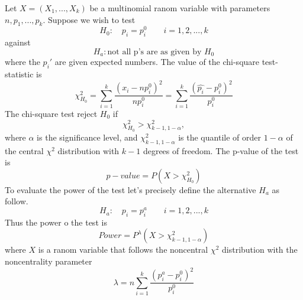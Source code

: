 \documentclass{article}
\begin{document}
Let $X=(X_1, ..., X_k)$ be a multinomial ranom variable with parameters
$n, p_1, ..., p_k$. Suppose we wish to test
\begin{equation}\label{goodness_of_fit_h_0}
    H_0: \quad p_i=p_{i}^0 \qquad i =1,2,...,k
\end{equation}
against
\begin{equation}
    H_a: \mbox{not all p's are as given by } H_0
\end{equation}
where the $p_{i}'$ are given expected numbers. The value of the chi-square test-statistic is
\begin{equation}
    \chi^2_{H_0} = \sum_{i=1}^k \frac{\left(x_i - np_{i}^0\right)^2}{np_{i}^0} = \sum_{i=1}^k \frac{\left(\widehat{p_i}  - p_{i}^0\right)^2}{p_{i}^0}
\end{equation}
The chi-square test reject $H_0$ if
\begin{equation}
    \chi^2_{H_0} > \chi^2_{k-1,1-\alpha},
\end{equation}
where $\alpha$ is the significance level, and $\chi^2_{k-1,1-\alpha}$ is the 
quantile of order $1-\alpha$ of the central $\chi^2$ distribution with $k-1$ degrees of
freedom.
The p-value of the test is
\begin{equation}
    p-value = P\left(X>\chi^2_{H_0}\right)
\end{equation}
To evaluate the power of the test let's precisely define the alternative $H_a$ as follow.
\begin{equation}\label{goodness_of_fit_h_a}
    H_a: \quad p_i=p_{i}^a \qquad i =1,2,...,k
\end{equation}
Thus the power o the test is
\begin{equation}
    Power = P^{\lambda}\left(X > \chi^2_{k-1,1-\alpha}\right)
\end{equation}
where $X$ is a ranom variable that follows the noncentral $\chi^2$ distribution with the noncentrality parameter
\begin{equation}\label{goodness_of_fit_lambda}
    \lambda = n \sum_{i=1}^k \frac{\left(p_{i}^a-p_{i}^0\right)^2}{p_{i}^0}
\end{equation}
\end{document}
